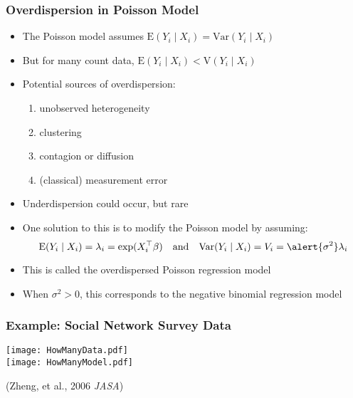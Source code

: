 \documentclass{beamer}
\begin{document}
\begin{frame}
  \frametitle{Overdispersion in Poisson Model}

  \begin{itemize}
  \item The Poisson model assumes $\text{E}(Y_i\mid X_i) = \text{Var}(Y_i\mid X_i)$
  \item But for many count data, $\text{E}(Y_i\mid X_i) < \text{V}(Y_i\mid X_i)$
\pause
  \item Potential sources of overdispersion:
    \begin{enumerate}
    \item unobserved heterogeneity
    \item clustering
    \item contagion or diffusion
    \item (classical) measurement error
    \end{enumerate}

\pause
  \item Underdispersion could occur, but rare

\medskip
\pause
  \item One solution to this is to modify the Poisson model by assuming:
    $$ \text{E}(Y_i\mid X_i) = \lambda_i = \exp(X_i^\top\beta) \quad \text{and} \quad
    \text{Var}(Y_i\mid X_i) = V_i = \alert{\sigma^2}\lambda_i $$
  \item This is called the \alert{overdispersed Poisson regression} model
\pause
  \item When $\sigma^2 > 0$, this corresponds to  the
   negative binomial regression model
  \end{itemize}

\end{frame}

\begin{frame}
\frametitle{Example: Social Network Survey Data}

\begin{center}
  \texttt{[image: HowManyData.pdf]}\\
  \texttt{[image: HowManyModel.pdf]}
\end{center}
\flushright(Zheng, et al., 2006 {\it JASA})


\end{frame}
\end{document}
